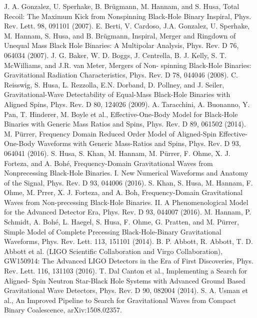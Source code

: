 \documentclass[binding=0.6cm, LaM]{sapthesis}
\begin{document}
\begin{thebibliography}{500}
   	 J. A. Gonzalez, U. Sperhake, B. Brügmann, M. Hannam, and S. Husa, Total Recoil: The Maximum Kick from Nonspinning Black-Hole Binary Inspiral, Phys. Rev. Lett. 98, 091101 (2007).
         E. Berti, V. Cardoso, J.A. Gonzalez, U. Sperhake, M. Hannam, S. Husa, and B. Brügmann, Inspiral, Merger and Ringdown of Unequal Mass Black Hole Binaries: A Multipolar Analysis, Phys. Rev. D 76, 064034 (2007).
          J. G. Baker, W. D. Boggs, J. Centrella, B. J. Kelly, S. T. McWilliams, and J.R. van Meter, Mergers of Non- spinning Black-Hole Binaries: Gravitational Radiation Characteristics, Phys. Rev. D 78, 044046 (2008). 
         C. Reisswig, S. Husa, L. Rezzolla, E.N. Dorband, D. Pollney, and J. Seiler, Gravitational-Wave Detectability of Equal-Mass Black-Hole Binaries with Aligned Spins, Phys. Rev. D 80, 124026 (2009). 
    	 A. Taracchini, A. Buonanno, Y. Pan, T. Hinderer, M. Boyle et al., Effective-One-Body Model for Black-Hole Binaries with Generic Mass Ratios and Spins, Phys. Rev. D 89, 061502 (2014).
          M. Pürrer, Frequency Domain Reduced Order Model of Aligned-Spin Effective-One-Body Waveforms with Generic Mass-Ratios and Spins, Phys. Rev. D 93, 064041 (2016). 
         S. Husa, S. Khan, M. Hannam, M. Pürrer, F. Ohme, X. J. Forteza, and A. Bohé, Frequency-Domain Gravitational Waves from Nonprecessing Black-Hole Binaries. I. New Numerical Waveforms and Anatomy of the Signal, Phys. Rev. D 93, 044006 (2016).
           S. Khan, S. Husa, M. Hannam, F. Ohme, M. Prrer, X. J. Forteza, and A. Boh, Frequency-Domain Gravitational Waves from Non-precessing Black-Hole Binaries. II. A Phenomenological Model for the Advanced Detector Era, Phys. Rev. D 93, 044007 (2016).
          M. Hannam, P. Schmidt, A. Bohé, L. Haegel, S. Husa, F. Ohme, G. Pratten, and M. Pürrer, Simple Model of Complete Precessing Black-Hole-Binary Gravitational Waveforms, Phys. Rev. Lett. 113, 151101 (2014).
          B. P. Abbott, R. Abbott, T. D. Abbott et al. (LIGO Scientific Collaboration and Virgo Collaboration), GW150914: The Advanced LIGO Detectors in the Era of First Discoveries, Phys. Rev. Lett. 116, 131103 (2016).
          T. Dal Canton et al., Implementing a Search for Aligned- Spin Neutron Star-Black Hole Systems with Advanced Ground Based Gravitational Wave Detectors, Phys. Rev. D 90, 082004 (2014).
 	 S. A. Usman et al., An Improved Pipeline to Search for Gravitational Waves from Compact Binary Coalescence, arXiv:1508.02357.

\end{thebibliography}
\end{document}
